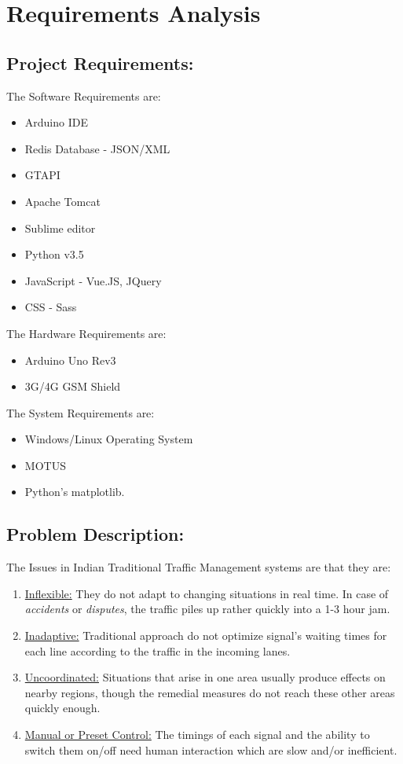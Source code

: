 \documentclass[12pt,a4paper,final]{report}
\begin{document}
\section{Requirements Analysis}
\subsection{Project Requirements:}
		The Software Requirements are:
	\begin{itemize}
		\item Arduino IDE
		\item Redis Database - JSON/XML
		\item GTAPI
		\item Apache Tomcat
		\item Sublime editor
		\item Python v3.5
		\item JavaScript - Vue.JS, JQuery
		\item CSS - Sass
	\end{itemize}
\vspace*{10pt}
		The Hardware Requirements are:
	\begin{itemize}
		\item Arduino Uno Rev3
		\item 3G/4G GSM Shield
	\end{itemize}
\vspace*{10pt}
		The System Requirements are:
	\begin{itemize}
		\item Windows/Linux Operating System
		\item MOTUS
		\item Python's matplotlib.
	\end{itemize}

\newpage 

\subsection{Problem Description:}
	The Issues in Indian Traditional Traffic Management systems are that they are:
	\begin{enumerate}
		\item \underline{Inflexible:} They do not adapt to changing situations in real time. In case of \emph{accidents} or \emph{disputes}, the traffic piles up rather quickly into a 1-3 hour jam.
		\item \underline{Inadaptive:} Traditional approach do not optimize signal's waiting times for each line according to the traffic in the incoming lanes.
		\item \underline{Uncoordinated:} Situations that arise in one area usually produce effects on nearby regions, though the remedial measures do not reach these other areas quickly enough.
		\item \underline{Manual or Preset Control:} The timings of each signal and the ability to switch them on/off need human interaction which are slow and/or inefficient.
	\end{enumerate}
\end{document}
